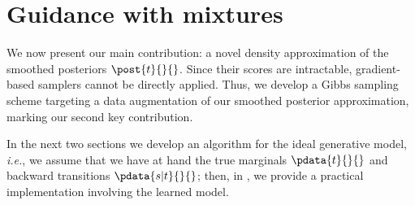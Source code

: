 \section{Guidance with mixtures}
We now present our main contribution: a novel density approximation of the smoothed posteriors $\post{t}{}{}$. Since their scores are intractable, gradient-based samplers cannot be directly applied. Thus, we develop a Gibbs sampling scheme targeting a data augmentation of our smoothed posterior approximation, marking our second key contribution. 

In the next two sections we develop an algorithm for the ideal generative model, \emph{i.e.}, we assume that we have at hand the true marginals $\pdata{t}{}{}$ and backward transitions $\pdata{s|t}{}{}$; then, in , we provide a practical implementation involving the learned model. 

